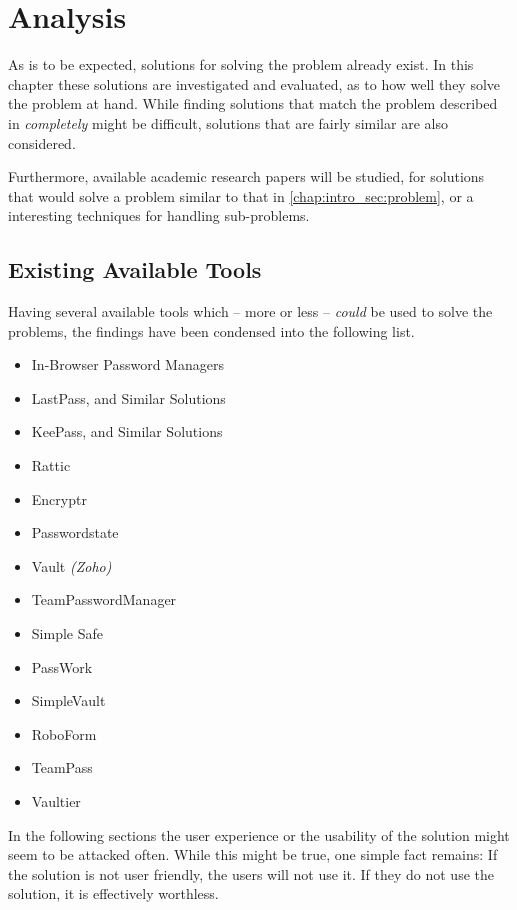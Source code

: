 \chapter{Analysis}
\label{chap:analysis}
	As is to be expected, solutions for solving the problem already exist. In this chapter these solutions are investigated and evaluated, as to how well they solve the problem at hand. While finding solutions that match the problem described in  \emph{completely} might be difficult, solutions that are fairly similar are also considered.

	Furthermore, available academic research papers will be studied, for solutions that would solve a problem similar to that in \ref{chap:intro_sec:problem}, or a interesting techniques for handling sub-problems.

	\section{Existing Available Tools}
		Having several available tools which -- more or less -- \emph{could} be used to solve the problems, the findings have been condensed into the following list.
		\begin{itemize}
			\item In-Browser Password Managers
			\item LastPass, and Similar Solutions
			\item KeePass, and Similar Solutions
			\item Rattic
			\item Encryptr
			\item Passwordstate
			\item Vault \emph{(Zoho)}
			\item TeamPasswordManager
			\item Simple Safe
			\item PassWork
			\item SimpleVault
			\item RoboForm
			\item TeamPass 
			\item Vaultier
		\end{itemize}
		In the following sections the user experience or the usability of the solution might seem to be attacked often. While this might be true, one simple fact remains: If the solution is not user friendly, the users will not use it. If they do not use the solution, it is effectively worthless.

